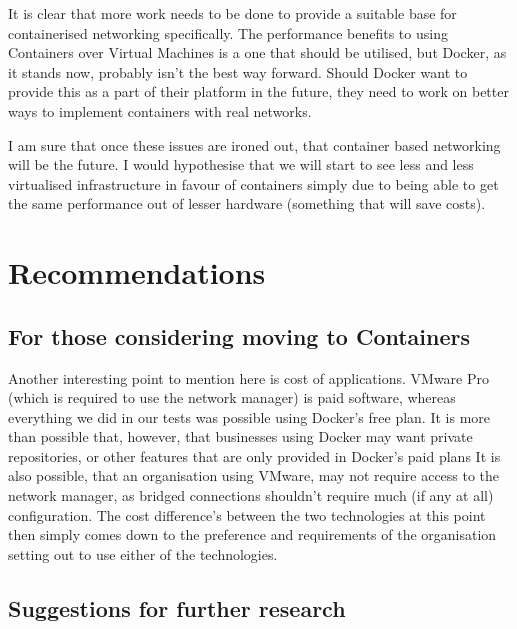 It is clear that more work needs to be done to provide a suitable base for containerised networking specifically. The performance benefits to using Containers over Virtual Machines is a one that should be utilised, but Docker, as it stands now, probably isn't the best way forward. Should Docker want to provide this as a part of their platform in the future, they need to work on better ways to implement containers with real networks.

I am sure that once these issues are ironed out, that container based networking will be the future. I would hypothesise that we will start to see less and less virtualised infrastructure in favour of containers simply due to being able to get the same performance out of lesser hardware (something that will save costs).

\chapter{Recommendations}

\section{For those considering moving to Containers}


Another interesting point to mention here is cost of applications. VMware Pro (which is required to use the network manager) is paid software, whereas everything we did in our tests was possible using Docker's free plan. It is more than possible that, however, that businesses using Docker may want private repositories, or other features that are only provided in Docker's paid plans It is also possible, that an organisation using VMware, may not require access to the network manager, as bridged connections shouldn't require much (if any at all) configuration. The cost difference's between the two technologies at this point then simply comes down to the preference and requirements of the organisation setting out to use either of the technologies.


\section{Suggestions for further research}

